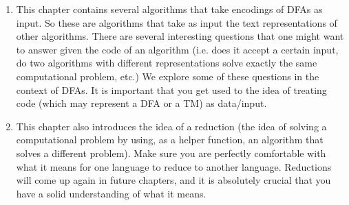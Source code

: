 \begin{enumerate}
    \item This chapter contains several algorithms that take encodings of DFAs as input. So these are algorithms that take as input the text representations of other algorithms. There are several interesting questions that one might want to answer given the code of an algorithm (i.e. does it accept a certain input, do two algorithms with different representations solve exactly the same computational problem, etc.) We explore some of these questions in the context of DFAs. It is important that you get used to the idea of treating code (which may represent a DFA or a TM) as data/input.
    \item This chapter also introduces the idea of a reduction (the idea of solving a computational problem by using, as a helper function, an algorithm that solves a different problem). Make sure you are perfectly comfortable with what it means for one language to reduce to another language. Reductions will come up again in future chapters, and it is absolutely crucial that you have a solid understanding of what it means.
\end{enumerate}

